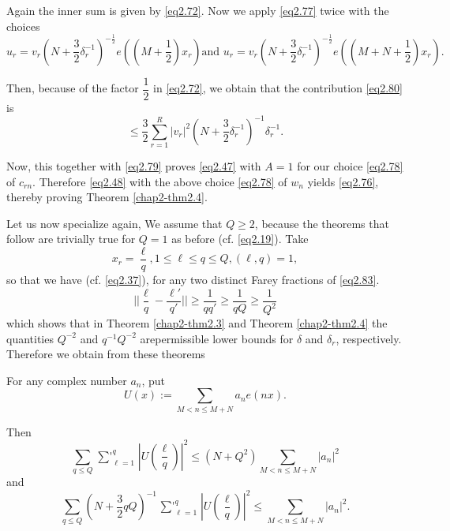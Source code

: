 Again the inner sum is given by \eqref{eq2.72}. Now we apply
\eqref{eq2.77} twice with the choices 
{\fontsize{10pt}{12pt}\selectfont
\begin{equation*}
u_r=v_r(N+
\frac{3}{2}\delta_r^{-1})^{-\frac{1}{2}}e((M+\frac{1}{2})x_r) \text{
  and }u_r=v_r(N+\frac{3}{2}\delta^{-1}_r)^{-\frac{1}{2}} e((M+N+
\frac{1}{2})x_r). \tag{2.81}\label{eq2.81} 
\end{equation*}}\relax

Then, because of the factor $\dfrac{1}{2}$ in \eqref{eq2.72}, we obtain that
the contribution \eqref{eq2.80} is 
\begin{equation*}
\leq \frac{3}{2}\sum_{r=1}^{R} |v_r|^2(N +
\frac{3}{2}\delta^{-1}_r)^{-1}\delta^{-1}_r. \tag{2.82}\label{eq2.82} 
\end{equation*}

Now, this together with \eqref{eq2.79} proves \eqref{eq2.47} with $A=1$ for our
choice \eqref{eq2.78} of $c_{rn}$. Therefore \eqref{eq2.48} with the
above choice \eqref{eq2.78} of $w_n$ yields \eqref{eq2.76}, thereby
proving Theorem \ref{chap2-thm2.4}.  

Let us now specialize again, We assume that $Q \geq 2$, because the
theorems that follow are trivially true for $Q=1$ as before
(cf. \eqref{eq2.19}). Take 
\begin{equation*}
x_r=\frac{\ell}{q},1 \leq \ell \leq q \leq Q, (\ell,q)=1,
\tag{2.83}\label{eq2.83} 
\end{equation*}
so that we have (cf. \eqref{eq2.37}), for any two distinct Farey
fractions of \eqref{eq2.83}. 
\begin{equation*}
\bigg|\bigg|\frac{\ell}{q}-\frac{\ell'}{q'}\bigg|\bigg| \geq
\frac{1}{qq'} \geq \frac{1}{qQ} \geq \frac{1}{Q^2}
\tag{2.84}\label{eq2.84} 
\end{equation*}
which shows that in Theorem \ref{chap2-thm2.3} and Theorem
\ref{chap2-thm2.4} the quantities $Q^{-2}$ and $q^{-1}Q^{-2}$
are\pageoriginale permissible lower bounds for $\delta$ and
$\delta_r$, respectively. Therefore we obtain from these theorems 

\begin{theorem}\label{chap2-thm2.5}%
For any complex number $a_n$, put
\begin{equation*} 
U(x):=\sum_{M<n \leq M+N} a_n e(nx). \tag{2.85}\label{eq2.85}
\end{equation*} 
\end{theorem}

Then
\begin{equation*}
\sum_{q \leq Q} \mathop{\sum{}'}_{\ell=1}^{q} \left|U(\frac{\ell}{q})\right|^2
\leq (N+Q^2) \sum_{M < n\leq M+N} |a_n|^2 \tag{2.86}\label{eq2.86} 
\end{equation*}
and
\begin{equation*}
\sum_{q \leq Q}(N+\frac{3}{2}qQ)^{-1}
\mathop{\sum{}'}^{q}_{\ell=1}|U(\frac{\ell}{q})|^2 
\leq \sum_{M <n \leq M+N} |a_n|^2. \tag{2.87}\label{eq2.87} 
\end{equation*}

